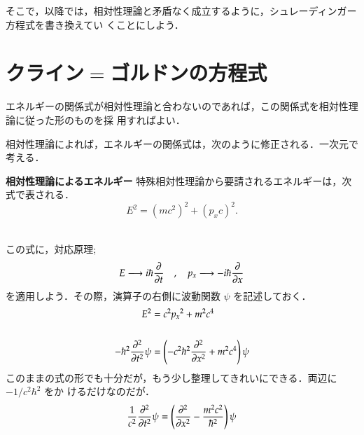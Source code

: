         そこで，以降では，相対性理論と矛盾なく成立するように，シュレーディンガー方程式を書き換えてい
        くことにしよう．


    \section{クライン$=$ゴルドンの方程式}
    エネルギーの関係式が相対性理論と合わないのであれば，この関係式を相対性理論に従った形のものを採
    用すればよい．

    相対性理論によれば，エネルギーの関係式は，次のように修正される．一次元で考える．\\
        \begin{itembox}[l]{{\bf 相対性理論によるエネルギー}}
            特殊相対性理論から要請されるエネルギーは，次式で表される．
            \begin{equation*}
                E^{2} = \left( mc^{2} \right)^{2} + \left( p_{x}c \right)^{2}.
            \end{equation*}
        \end{itembox}\\

    この式に，対応原理;
        \begin{equation*}
            E     \longrightarrow  i \hbar \frac{\partial}{\partial t}
            \quad,\quad
            p_{x} \longrightarrow -i \hbar \frac{\partial}{\partial x}
        \end{equation*}
    を適用しよう．その際，演算子の右側に波動関数 $\psi$ を記述しておく．
        \begin{align}
            E^{2}
                &= c^{2}{p_{x}}^{2} + m^{2}c^{4}  \notag \\  \notag \\
            - \hbar^{2} \frac{\partial^{2}}{\partial t^{2}} \psi
                &= \left( - c^{2} \hbar^{2} \frac{\partial^{2}}{\partial x^{2}} + m^{2}c^{4} \right) \psi
        \end{align}
    このままの式の形でも十分だが，もう少し整理してきれいにできる．両辺に $-1/c^{2}\hbar^{2}$ をか
    けるだけなのだが．
        \begin{equation*}
            \frac{1}{c^{2}}\frac{\partial^{2}}{\partial t^{2}} \psi
                = \left( \frac{\partial^{2}}{\partial x^{2}} - \frac{m^{2}c^{2}}{\hbar^{2}} \right) \psi
        \end{equation*}

